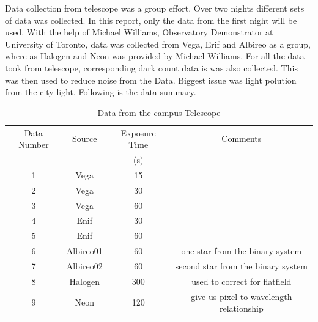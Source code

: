 \documentclass[a4paper,12pt]{article}
\begin{document}
Data collection from telescope was a group effort. Over two nights different sets of data was collected. In this report, only the data from the first night will be used. With the help of Michael Williams, Observatory Demonstrator at University of Toronto, data was collected from Vega, Erif and Albireo as a group, where as Halogen and Neon was provided by Michael Williams. For all the data took from telescope, corresponding dark count data is was also collected. This was then used to reduce noise from the Data. Biggest issue was light polution from the city light. Following is the data summary.
\begin{table}[H]
\centering %
\caption{Data from the campus Telescope}
\footnotesize

\begin{tabular}{cccc}%
\hline
\hline

Data Number & Source & Exposure Time & Comments \\
& & (s) &\\

 
\hline
\hline
1   &   Vega    &  15  & \\
2   &   Vega    &  30  & \\
3   &   Vega    &  60  & \\
4   &   Enif    &  30  &\\
5   &   Enif    &  60  &\\
6   &   Albireo01&  60  & one star from the binary system\\   
7   &   Albireo02&  60  & second star from the binary system\\
8   &   Halogen &  300    & used to correct for flatfield \\
9   &   Neon    &  120    & give us pixel to wavelength relationship\\


\hline
\hline

\end{tabular}
\label{table:telescope} %
\end{table}

\end{document}
